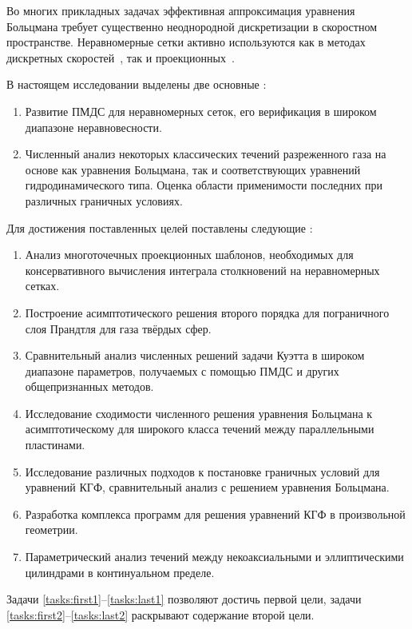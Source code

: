 Во многих прикладных задачах эффективная аппроксимация уравнения Больцмана
требует существенно неоднородной дискретизации в скоростном пространстве.
Неравномерные сетки активно используются
как в методах дискретных скоростей~\autocite{Kolobov2011, Morris2012},
так и проекционных~\autocite{Heintz2008, Wu2014}.

В настоящем исследовании выделены две основные {\aim}:
\begin{enumerate}
    \item Развитие ПМДС для неравномерных сеток, его верификация в широком диапазоне неравновесности.
    \item Численный анализ некоторых классических течений разреженного газа на основе
    как уравнения Больцмана, так и соответствующих уравнений гидродинамического типа.
    Оценка области применимости последних при различных граничных условиях.
\end{enumerate}
Для достижения поставленных целей поставлены следующие {\tasks}:
\begin{enumerate}
    \item Анализ многоточечных проекционных шаблонов, необходимых для консервативного вычисления
    интеграла столкновений на неравномерных сетках.\label{tasks:first1}
    \item Построение асимптотического решения второго порядка
    для пограничного слоя Прандтля для газа твёрдых сфер. \label{tasks:first2}
    \item Сравнительный анализ численных решений задачи Куэтта в широком диапазоне параметров,
    получаемых с помощью ПМДС и других общепризнанных методов.
    \item Исследование сходимости численного решения уравнения Больцмана к асимптотическому
    для широкого класса течений между параллельными пластинами.
    \item Исследование различных подходов к постановке граничных условий для уравнений КГФ,
    сравнительный анализ с решением уравнения Больцмана.\label{tasks:last1}
    \item Разработка комплекса программ для решения уравнений КГФ в произвольной геометрии.
    \item Параметрический анализ течений между некоаксиальными и эллиптическими цилиндрами
    в континуальном пределе.\label{tasks:last2}
\end{enumerate}
Задачи \ref{tasks:first1}--\ref{tasks:last1} позволяют достичь первой цели,
задачи \ref{tasks:first2}--\ref{tasks:last2} раскрывают содержание второй цели.

